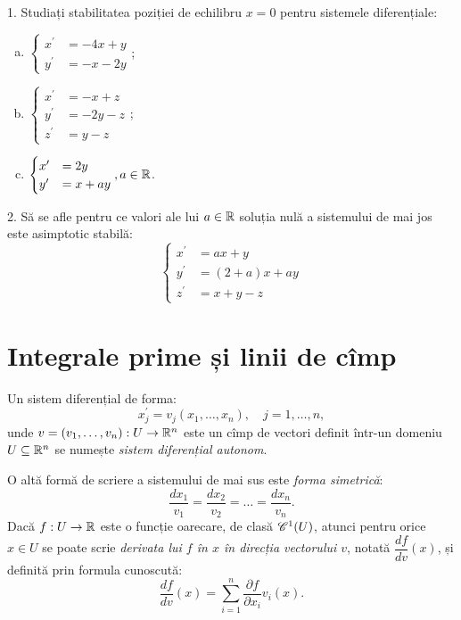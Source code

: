 1. Studiați stabilitatea poziției de echilibru $ x = 0 $ pentru sistemele
diferențiale:
\begin{enumerate}[(a)]
\item $ \begin{cases}
    x^\prime &= -4x + y \\
    y^\prime &= -x - 2y
  \end{cases} $;
\item $ \begin{cases}
    x^\prime &= -x + z \\
    y^\prime &= -2y - z \\
    z^\prime &= y - z
  \end{cases} $;
\item $ \begin{cases}
    x^\prime &= 2y \\
    y^\prime &= x + ay
  \end{cases}, a \in \mathbb{R} $.
\end{enumerate}

\vspace{1cm}

2. Să se afle pentru ce valori ale lui $ a \in \mathbb{R} $ soluția nulă a
sistemului de mai jos este asimptotic stabilă:
\[
  \begin{cases}
    x^\prime &= ax + y \\
    y^\prime &= (2 + a)x + ay \\
    z^\prime &= x + y - z
  \end{cases}
\]


\section{Integrale prime și linii de cîmp}

\begin{definition}\label{def:sist-autonom}
  Un sistem diferențial de forma:
  \[
    x^\prime_j = v_j(x_1, \dots, x_n), \quad j = 1, \dots, n,
  \]
  unde $ v = (v_1, \dots, v_n) : U \to \mathbb{R}^n $ este un cîmp de vectori definit
  într-un domeniu $ U \subseteq \mathbb{R}^n $ se numește \emph{sistem diferențial autonom}.
\end{definition}

O altă formă de scriere a sistemului de mai sus este \emph{forma simetrică}:
\[
  \dfrac{dx_1}{v_1} = \dfrac{dx_2}{v_2} = \dots = \dfrac{dx_n}{v_n}.
\]
Dacă $ f : U \to \mathbb{R} $ este o funcție oarecare, de clasă $ \mathscr{C}^1(U) $, atunci
pentru orice $ x \in U $ se poate scrie \emph{derivata lui $ f $ în $ x $ %
  în direcția vectorului $ v $}, notată $ \dfrac{df}{dv}(x) $, și definită
prin formula cunoscută:
\[
  \dfrac{df}{dv}(x) = \sum_{i = 1}^n \dfrac{\partial f}{\partial x_i} v_i(x).
\]

